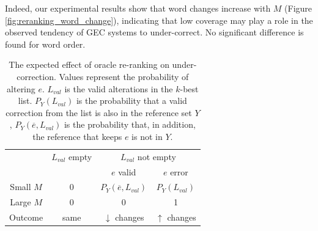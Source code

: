 \documentclass[a4paper]{article}
\begin{document}
Indeed, our experimental results show that word changes increase with $M$ (Figure \ref{fig:reranking_word_change}),
indicating that low coverage may play a role in the observed tendency of GEC systems to under-correct.
No significant difference is found for word order.

\begin{table}[t]
	\centering
	\small
	\singlespacing
	\begin{tabular}{c|c|cc}
		& $L_{val}$ empty & \multicolumn{2}{c}{$L_{val}$ not empty} \\
		&            & $e$ valid & $e$ error \\ \hline
		\multicolumn{1}{c|}{Small $M$} & 0 & $P_Y(\overline{e}, L_{val})$ & $P_Y\left(L_{val}\right)$    \\
		\multicolumn{1}{c|}{Large $M$} & 0 & 0              & 1                  \\ \hline
		\multicolumn{1}{c|}{Outcome}            & same  & $\downarrow$ changes        & $\uparrow$ changes
	\end{tabular}
	\caption{\label{ta:oracle_expected_results}
    The expected effect of oracle re-ranking  on under-correction.
		Values represent the probability of altering $e$. $L_{val}$ is the valid alterations in the $k$-best list. $P_Y\left(L_{val}\right)$ is the probability that a valid correction from the list is also in the reference set $Y$,
		$P_Y(\overline{e}, L_{val})$ is the probability that, in addition, the reference that keeps $e$ is not in $Y$.
	}
	
	
\end{table}
%
\end{document}
